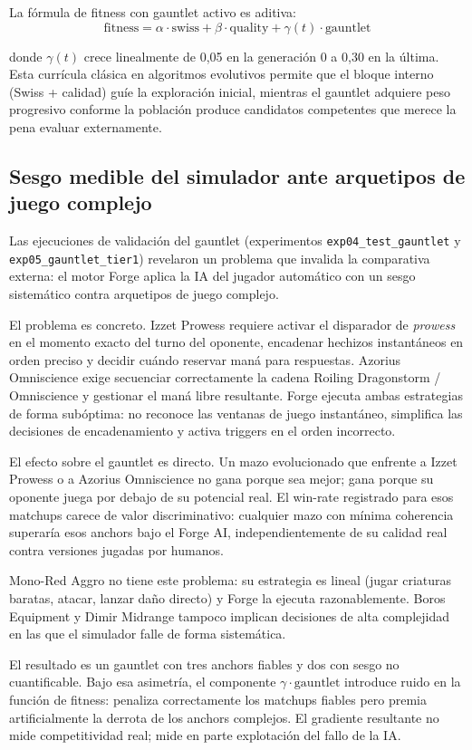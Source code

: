 La fórmula de fitness con gauntlet activo es aditiva:
$$\text{fitness} = \alpha \cdot \text{swiss} + \beta \cdot \text{quality} + \gamma(t) \cdot \text{gauntlet}$$

donde $\gamma(t)$ crece linealmente de 0,05 en la generación 0 a 0,30 en la última. Esta currícula clásica en algoritmos evolutivos permite que el bloque interno (Swiss + calidad) guíe la exploración inicial, mientras el gauntlet adquiere peso progresivo conforme la población produce candidatos competentes que merece la pena evaluar externamente.

\subsection{Sesgo medible del simulador ante arquetipos de juego complejo}

Las ejecuciones de validación del gauntlet (experimentos \texttt{exp04\_test\_gauntlet} y \texttt{exp05\_gauntlet\_tier1}) revelaron un problema que invalida la comparativa externa: el motor Forge aplica la IA del jugador automático con un sesgo sistemático contra arquetipos de juego complejo.

El problema es concreto. Izzet Prowess requiere activar el disparador de \emph{prowess} en el momento exacto del turno del oponente, encadenar hechizos instantáneos en orden preciso y decidir cuándo reservar maná para respuestas. Azorius Omniscience exige secuenciar correctamente la cadena Roiling Dragonstorm / Omniscience y gestionar el maná libre resultante. Forge ejecuta ambas estrategias de forma subóptima: no reconoce las ventanas de juego instantáneo, simplifica las decisiones de encadenamiento y activa triggers en el orden incorrecto.

El efecto sobre el gauntlet es directo. Un mazo evolucionado que enfrente a Izzet Prowess o a Azorius Omniscience no gana porque sea mejor; gana porque su oponente juega por debajo de su potencial real. El win-rate registrado para esos matchups carece de valor discriminativo: cualquier mazo con mínima coherencia superaría esos anchors bajo el Forge AI, independientemente de su calidad real contra versiones jugadas por humanos.

Mono-Red Aggro no tiene este problema: su estrategia es lineal (jugar criaturas baratas, atacar, lanzar daño directo) y Forge la ejecuta razonablemente. Boros Equipment y Dimir Midrange tampoco implican decisiones de alta complejidad en las que el simulador falle de forma sistemática.

El resultado es un gauntlet con tres anchors fiables y dos con sesgo no cuantificable. Bajo esa asimetría, el componente $\gamma \cdot \text{gauntlet}$ introduce ruido en la función de fitness: penaliza correctamente los matchups fiables pero premia artificialmente la derrota de los anchors complejos. El gradiente resultante no mide competitividad real; mide en parte explotación del fallo de la IA.

